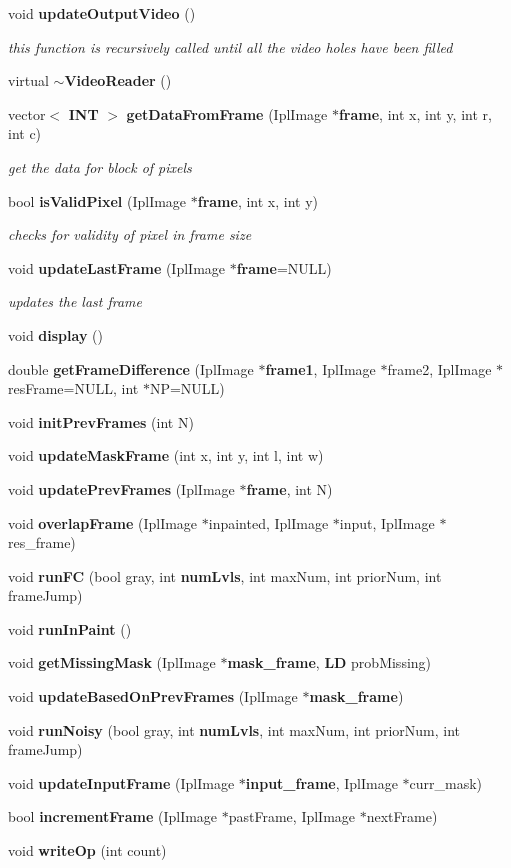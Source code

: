 \begin{CompactItemize}
void {\bf updateOutputVideo} ()
\begin{CompactList}\small\item\em this function is recursively called until all the video holes have been filled \item\end{CompactList}\item 
virtual {\bf $\sim$VideoReader} ()
\item 
vector$<$ {\bf INT} $>$ {\bf getDataFromFrame} (IplImage $\ast${\bf frame}, int x, int y, int r, int c)
\begin{CompactList}\small\item\em get the data for block of pixels \item\end{CompactList}\item 
bool {\bf isValidPixel} (IplImage $\ast${\bf frame}, int x, int y)
\begin{CompactList}\small\item\em checks for validity of pixel in frame size \item\end{CompactList}\item 
void {\bf updateLastFrame} (IplImage $\ast${\bf frame}=NULL)
\begin{CompactList}\small\item\em updates the last frame \item\end{CompactList}\item 
void {\bf display} ()
\item 
double {\bf getFrameDifference} (IplImage $\ast${\bf frame1}, IplImage $\ast$frame2, IplImage $\ast$resFrame=NULL, int $\ast$NP=NULL)
\item 
void {\bf initPrevFrames} (int N)
\item 
void {\bf updateMaskFrame} (int x, int y, int l, int w)
\item 
void {\bf updatePrevFrames} (IplImage $\ast${\bf frame}, int N)
\item 
void {\bf overlapFrame} (IplImage $\ast$inpainted, IplImage $\ast$input, IplImage $\ast$res\_\-frame)
\item 
void {\bf runFC} (bool gray, int {\bf numLvls}, int maxNum, int priorNum, int frameJump)
\item 
void {\bf runInPaint} ()
\item 
void {\bf getMissingMask} (IplImage $\ast${\bf mask\_\-frame}, {\bf LD} probMissing)
\item 
void {\bf updateBasedOnPrevFrames} (IplImage $\ast${\bf mask\_\-frame})
\item 
void {\bf runNoisy} (bool gray, int {\bf numLvls}, int maxNum, int priorNum, int frameJump)
\item 
void {\bf updateInputFrame} (IplImage $\ast${\bf input\_\-frame}, IplImage $\ast$curr\_\-mask)
\item 
bool {\bf incrementFrame} (IplImage $\ast$pastFrame, IplImage $\ast$nextFrame)
\item 
void {\bf writeOp} (int count)
\end{CompactItemize}
